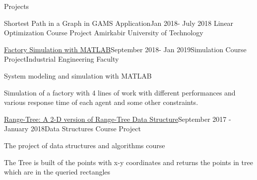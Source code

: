 \documentclass{resume} %
\begin{document}
\begin{rSection}{Projects}
\begin{rSubsection}{Shortest Path in a Graph in GAMS Application}{Jan 2018- July 2018}{
Linear Optimization Course Project }{Amirkabir University of Technology}
\end{rSubsection}

\begin{rSubsection}{\href{https://github.com/pouyaaghahoseini/System-Queueing-Simulation}{Factory Simulation with MATLAB}}{September 2018- Jan 2019}{Simulation Course Project}{Industrial Engineering Faculty}
	\item System modeling and simulation with MATLAB
	\item Simulation of a factory with 4 lines of work with different performances and various response time of each agent and some other constraints.

	
\end{rSubsection}

\begin{rSubsection}{\href{https://github.com/pouyaaghahoseini/DS-Course}{Range-Tree: A 2-D version of Range-Tree Data Structure}}{September 2017 - January 2018}{Data Structures Course Project}{ }
	\item The project of data structures and algorithms course
	\item The Tree is built of the points with x-y coordinates and returns the points in tree which are in the queried rectangles
	
\end{rSubsection}


	
\end{rSection}
\end{document}
